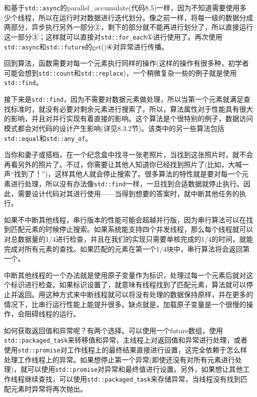 和基于\texttt{std::async}的parallel\_accumulate(代码8.5)一样，因为不知道需要使用多少个线程，所以在运行时对数据进行迭代划分。像之前一样，将每一级的数据分成两部分，异步执行另外一部分②，剩下的部分就不能再进行划分了，所以直接运行这一部分③；这样就可以直接对\texttt{std::for\_each}①进行使用了。再次使用\texttt{std::async}和\texttt{std::future}的get()④对异常进行传播。

回到算法，函数需要对每一个元素执行同样的操作(这样的操作有很多种，初学者可能会想到\texttt{std::count}和\texttt{std::replace})，一个稍微复杂一些的例子就是使用\texttt{std::find}。


接下来是\texttt{std::find}，因为不需要对数据元素做处理，所以当第一个元素就满足查找标准时，就没有必要对剩余元素进行搜索了。所以，算法属性对于性能具有很大的影响，并且对并行实现有着直接的影响。这个算法是个很特别的例子，数据访问模式都会对代码的设计产生影响(详见8.3.2节)。该类中的另一些算法包括\texttt{std::equal}和\texttt{std::any\_of}。

当你和妻子或搭档，在一个纪念盒中找寻一张老照片，当找到这张照片时，就不会再看另外的照片了。不过，你需要让其他人知道你已经找到照片了(比如，大喊一声“找到了！”)，这样其他人就会停止搜索了。很多算法的特性就是要对每一个元素进行处理，所以没有办法像\texttt{std::find}一样，一旦找到合适数据就停止执行。因此，需要设计代码对其进行使用——当得到想要的答案时，就中断其他任务的执行。

如果不中断其他线程，串行版本的性能可能会超越并行版，因为串行算法可以在找到匹配元素的时候停止搜索。如果系统能支持四个并发线程，那么每个线程就可以对总数据量的1/4进行检查，并且在我们的实现只需要单核完成的1/4的时间，就能完成对所有元素的查找。如果匹配的元素在第一个1/4块中，串行算法将会返回第一个。

中断其他线程的一个办法就是使用原子变量作为标识，处理过每一个元素后就对这个标识进行检查。如果标识设置了，就意味有线程找到了匹配元素，算法就可以停止并返回。用这种方式来中断线程就可以将没有处理的数据保持原样，并在更多的情况下，比串行运行性能上能提升很多。缺点就是，加载原子变量是一个很慢的操作，会阻碍线程的运行。

如何获取返回值和异常呢？有两个选择。可以使用一个future数组，使用\texttt{std::packaged\_task}来转移值和异常，主线程上对返回值和异常进行处理，或者使用\texttt{std::promise}对工作线程上的最终结果直接进行设置，这完全依赖于怎么样处理工作线程上的异常。如果想停止第一个异常(即使还没有对所有元素进行处理)，就可以使用\texttt{std::promise}对异常和最终值进行设置。另外，如果想让其他工作线程继续查找，可以使用\texttt{std::packaged\_task}来存储异常，当线程没有找到匹配元素时异常将再次抛出。

